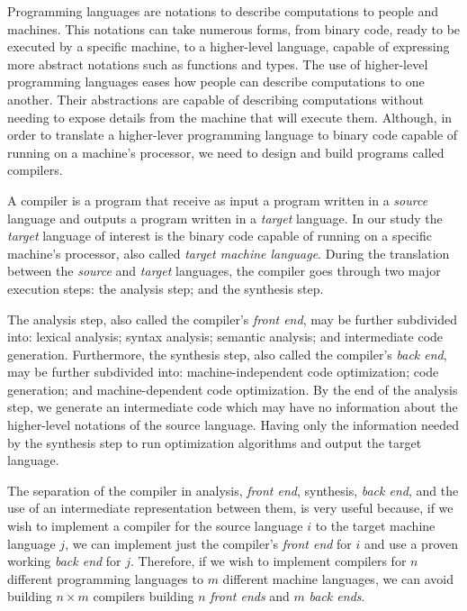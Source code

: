 \documentclass[
  english,
  lmodern,
  oneside
]{ufsc-thesis-rn46-2019/ufsc-thesis-rn46-2019}
\begin{document}
Programming languages are notations to describe computations to people and machines.
This notations can take numerous forms, from binary code, ready to be executed by a specific machine, to a higher-level language, capable of expressing more abstract notations such as functions and types.
The use of higher-level programming languages eases how people can describe computations to one another.
Their abstractions are capable of describing computations without needing to expose details from the machine that will execute them.
Although, in order to translate a higher-lever programming language to binary code capable of running on a machine's processor, we need to design and build programs called compilers.

A compiler is a program that receive as input a program written in a \textit{source} language and outputs a program written in a \textit{target} language.
In our study the \textit{target} language of interest is the binary code capable of running on a specific machine's processor, also called \textit{target machine language}.
During the translation between the \textit{source} and \textit{target} languages, the compiler goes through two major execution steps: the analysis step; and the synthesis step.

The analysis step, also called the compiler's \textit{front end}, may be further subdivided into: lexical analysis; syntax analysis; semantic analysis; and intermediate code generation.
Furthermore, the synthesis step, also called the compiler's \textit{back end}, may be further subdivided into: machine-independent code optimization; code generation; and machine-dependent code optimization.
By the end of the analysis step, we generate an intermediate code which may have no information about the higher-level notations of the source language.
Having only the information needed by the synthesis step to run optimization algorithms and output the target language.

The separation of the compiler in analysis, \textit{front end}, synthesis, \textit{back end}, and the use of an intermediate representation between them, is very useful because, if we wish to implement a compiler for the source language $i$ to the target machine language $j$, we can implement just the compiler's \textit{front end} for $i$ and use a proven working \textit{back end} for $j$.
Therefore, if we wish to implement compilers for $n$ different programming languages to $m$ different machine languages, we can avoid building $n \times m$ compilers building $n$ \textit{front ends} and $m$ \textit{back ends}.
\end{document}
